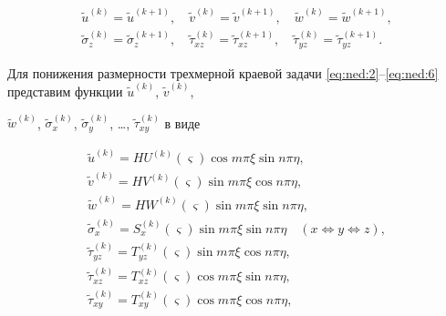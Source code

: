 \begin{equation}

\label{eq:ned:6}

\begin{array}{c}

\tilde u^{(k)}=\tilde u^{\left({k+1}\right)},\quad \tilde v^{(k)}=\tilde v^{\left({k+ 1}\right)},\quad \tilde w^{(k)}=\tilde w^{\left({k+1}\right)},\\

%

\tilde\sigma_z^{(k)}=\tilde\sigma_z^{\left({k+1}\right)},\quad \tilde\tau_{xz}^{(k)}=

\tilde\tau_{xz}^{\left({k+1}\right)},\quad \tilde\tau_{yz}^{(k)}=\tilde\tau_{yz}^{\left({k+1}\right)}.

\end{array}

\end{equation}



Для понижения размерности трехмерной краевой задачи \eqref{eq:ned:2}--\eqref{eq:ned:6} представим функции $\tilde u^{(k)}$, $\tilde v^{(k)}$,

$\tilde w^{(k)}$, $\tilde\sigma_x^{(k)}$, $\tilde\sigma_y^{(k)}$, \ldots, $\tilde\tau_{xy}^{(k)}$ в виде

\begin{equation}

\label{eq:ned:7}

\begin{array}{l}

\tilde u^{(k)}=HU^{(k)}(\varsigma)\cos m\pi\xi\sin n\pi\eta,\\

\tilde v^{(k)}=HV^{(k)}(\varsigma)\sin m\pi\xi\cos n\pi\eta,\\ 

%

\tilde w^{(k)}=HW^{(k)}(\varsigma)\sin m\pi\xi\sin n\pi\eta,\\ 



\tilde\sigma_x^{(k)}=S_x^{(k)}(\varsigma)\sin m\pi\xi\sin n\pi\eta\quad (x\Leftrightarrow y\Leftrightarrow z),\\ 

%

\tilde\tau_{yz}^{(k)}=T_{yz}^{(k)}(\varsigma)\sin m\pi\xi\cos n\pi\eta,\\ 


\tilde\tau_{xz}^{(k)}=T_{xz}^{(k)}(\varsigma)\cos m\pi\xi\sin n\pi\eta,\\

\tilde\tau_{xy}^{(k)}=T_{xy}^{(k)}(\varsigma)\cos m\pi\xi\cos n\pi\eta,

\end{array}

\end{equation}


